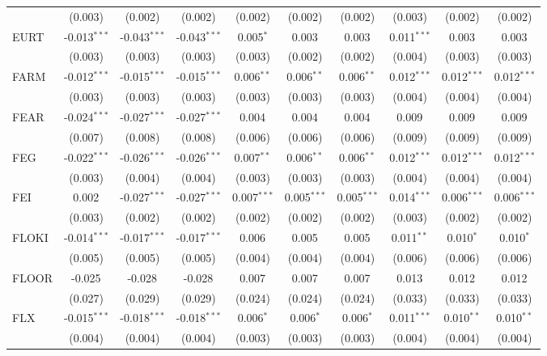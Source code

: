 \begin{table}[!htbp]
\begin{tabular}{@{\extracolsep{5pt}}lccccccccc}
  & (0.003) & (0.002) & (0.002) & (0.002) & (0.002) & (0.002) & (0.003) & (0.002) & (0.002) \\
 EURT & -0.013$^{***}$ & -0.043$^{***}$ & -0.043$^{***}$ & 0.005$^{*}$ & 0.003$^{}$ & 0.003$^{}$ & 0.011$^{***}$ & 0.003$^{}$ & 0.003$^{}$ \\
  & (0.003) & (0.003) & (0.003) & (0.003) & (0.002) & (0.002) & (0.004) & (0.003) & (0.003) \\
 FARM & -0.012$^{***}$ & -0.015$^{***}$ & -0.015$^{***}$ & 0.006$^{**}$ & 0.006$^{**}$ & 0.006$^{**}$ & 0.012$^{***}$ & 0.012$^{***}$ & 0.012$^{***}$ \\
  & (0.003) & (0.003) & (0.003) & (0.003) & (0.003) & (0.003) & (0.004) & (0.004) & (0.004) \\
 FEAR & -0.024$^{***}$ & -0.027$^{***}$ & -0.027$^{***}$ & 0.004$^{}$ & 0.004$^{}$ & 0.004$^{}$ & 0.009$^{}$ & 0.009$^{}$ & 0.009$^{}$ \\
  & (0.007) & (0.008) & (0.008) & (0.006) & (0.006) & (0.006) & (0.009) & (0.009) & (0.009) \\
 FEG & -0.022$^{***}$ & -0.026$^{***}$ & -0.026$^{***}$ & 0.007$^{**}$ & 0.006$^{**}$ & 0.006$^{**}$ & 0.012$^{***}$ & 0.012$^{***}$ & 0.012$^{***}$ \\
  & (0.003) & (0.004) & (0.004) & (0.003) & (0.003) & (0.003) & (0.004) & (0.004) & (0.004) \\
 FEI & 0.002$^{}$ & -0.027$^{***}$ & -0.027$^{***}$ & 0.007$^{***}$ & 0.005$^{***}$ & 0.005$^{***}$ & 0.014$^{***}$ & 0.006$^{***}$ & 0.006$^{***}$ \\
  & (0.003) & (0.002) & (0.002) & (0.002) & (0.002) & (0.002) & (0.003) & (0.002) & (0.002) \\
 FLOKI & -0.014$^{***}$ & -0.017$^{***}$ & -0.017$^{***}$ & 0.006$^{}$ & 0.005$^{}$ & 0.005$^{}$ & 0.011$^{**}$ & 0.010$^{*}$ & 0.010$^{*}$ \\
  & (0.005) & (0.005) & (0.005) & (0.004) & (0.004) & (0.004) & (0.006) & (0.006) & (0.006) \\
 FLOOR & -0.025$^{}$ & -0.028$^{}$ & -0.028$^{}$ & 0.007$^{}$ & 0.007$^{}$ & 0.007$^{}$ & 0.013$^{}$ & 0.012$^{}$ & 0.012$^{}$ \\
  & (0.027) & (0.029) & (0.029) & (0.024) & (0.024) & (0.024) & (0.033) & (0.033) & (0.033) \\
 FLX & -0.015$^{***}$ & -0.018$^{***}$ & -0.018$^{***}$ & 0.006$^{*}$ & 0.006$^{*}$ & 0.006$^{*}$ & 0.011$^{***}$ & 0.010$^{**}$ & 0.010$^{**}$ \\
  & (0.004) & (0.004) & (0.004) & (0.003) & (0.003) & (0.003) & (0.004) & (0.004) & (0.004) \\

\end{tabular}
\end{table}
